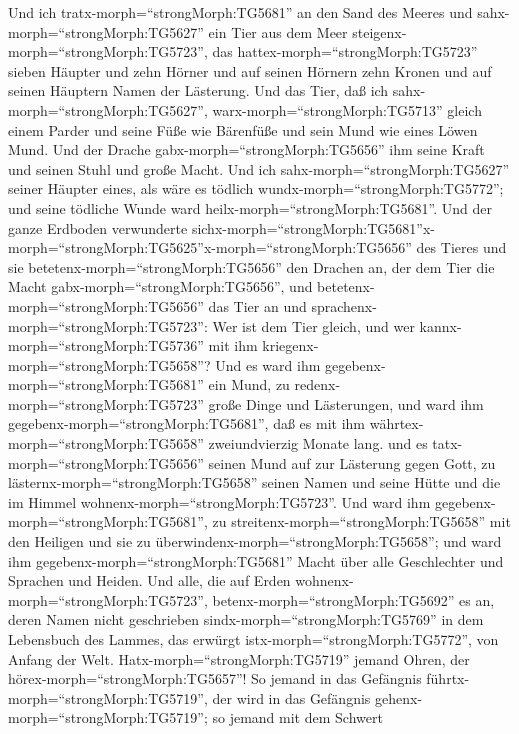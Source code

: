  Und ich tratx-morph=``strongMorph:TG5681'' an den Sand des
Meeres und sahx-morph=``strongMorph:TG5627'' ein Tier aus dem Meer
steigenx-morph=``strongMorph:TG5723'', das
hattex-morph=``strongMorph:TG5723'' sieben Häupter und zehn Hörner und
auf seinen Hörnern zehn Kronen und auf seinen Häuptern Namen der
Lästerung.  Und das Tier, daß ich
sahx-morph=``strongMorph:TG5627'', warx-morph=``strongMorph:TG5713''
gleich einem Parder und seine Füße wie Bärenfüße und sein Mund wie eines
Löwen Mund. Und der Drache gabx-morph=``strongMorph:TG5656'' ihm seine
Kraft und seinen Stuhl und große Macht.  Und ich
sahx-morph=``strongMorph:TG5627'' seiner Häupter eines, als wäre es
tödlich wundx-morph=``strongMorph:TG5772''; und seine tödliche Wunde
ward heilx-morph=``strongMorph:TG5681''. Und der ganze Erdboden
verwunderte
sichx-morph=``strongMorph:TG5681''\textbar x-morph=``strongMorph:TG5625''x-morph=``strongMorph:TG5656''
des Tieres  und sie betetenx-morph=``strongMorph:TG5656''
den Drachen an, der dem Tier die Macht
gabx-morph=``strongMorph:TG5656'', und
betetenx-morph=``strongMorph:TG5656'' das Tier an und
sprachenx-morph=``strongMorph:TG5723'': Wer ist dem Tier gleich, und wer
kannx-morph=``strongMorph:TG5736'' mit ihm
kriegenx-morph=``strongMorph:TG5658''?  Und es ward ihm
gegebenx-morph=``strongMorph:TG5681'' ein Mund, zu
redenx-morph=``strongMorph:TG5723'' große Dinge und Lästerungen, und
ward ihm gegebenx-morph=``strongMorph:TG5681'', daß es mit ihm
währtex-morph=``strongMorph:TG5658'' zweiundvierzig Monate lang.
 und es tatx-morph=``strongMorph:TG5656'' seinen Mund auf
zur Lästerung gegen Gott, zu lästernx-morph=``strongMorph:TG5658''
seinen Namen und seine Hütte und die im Himmel
wohnenx-morph=``strongMorph:TG5723''.  Und ward ihm
gegebenx-morph=``strongMorph:TG5681'', zu
streitenx-morph=``strongMorph:TG5658'' mit den Heiligen und sie zu
überwindenx-morph=``strongMorph:TG5658''; und ward ihm
gegebenx-morph=``strongMorph:TG5681'' Macht über alle Geschlechter und
Sprachen und Heiden.  Und alle, die auf Erden
wohnenx-morph=``strongMorph:TG5723'',
betenx-morph=``strongMorph:TG5692'' es an, deren Namen nicht geschrieben
sindx-morph=``strongMorph:TG5769'' in dem Lebensbuch des Lammes, das
erwürgt istx-morph=``strongMorph:TG5772'', von Anfang der Welt.
 Hatx-morph=``strongMorph:TG5719'' jemand Ohren, der
hörex-morph=``strongMorph:TG5657''!  So jemand in das
Gefängnis führtx-morph=``strongMorph:TG5719'', der wird in das Gefängnis
gehenx-morph=``strongMorph:TG5719''; so jemand mit dem Schwert
